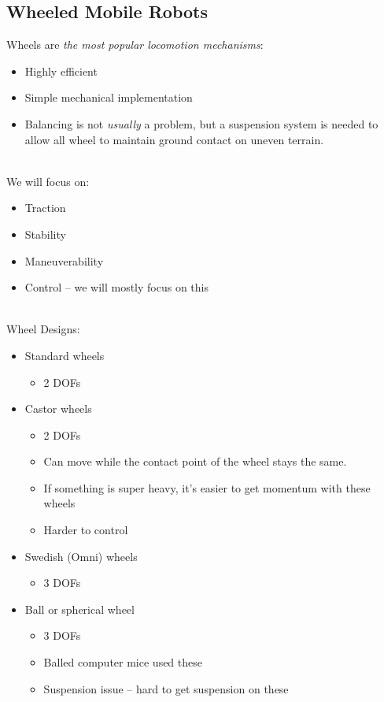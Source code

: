 \documentclass[13pt]{article}
\begin{document}
\subsection{Wheeled Mobile Robots}%
\noindent
Wheels are \textit{the most popular locomotion mechanisms}:
\begin{itemize}
	\item Highly efficient
	\item Simple mechanical implementation
	\item Balancing is not \textit{usually} a problem, but a suspension system is needed to allow all wheel to maintain
		ground contact on uneven terrain.
\end{itemize}

\hfill \\
\noindent
We will focus on:
\begin{itemize}
	\item Traction
	\item Stability
	\item Maneuverability
	\item Control -- we will mostly focus on this
\end{itemize}

\hfill \\
\noindent
Wheel Designs:
\begin{itemize}
	\item Standard wheels
	\begin{itemize}
		\item 2 DOFs
	\end{itemize}
	\item Castor wheels
	\begin{itemize}
		\item 2 DOFs
		\item Can move while the contact point of the wheel stays the same.
		\item If something is super heavy, it's easier to get momentum with these wheels
		\item Harder to control
	\end{itemize}
	\item Swedish (Omni) wheels
	\begin{itemize}
		\item 3 DOFs
	\end{itemize}
	\item Ball or spherical wheel
	\begin{itemize}
		\item 3 DOFs
		\item Balled computer mice used these
		\item Suspension issue -- hard to get suspension on these
	\end{itemize}
\end{itemize}
\end{document}
